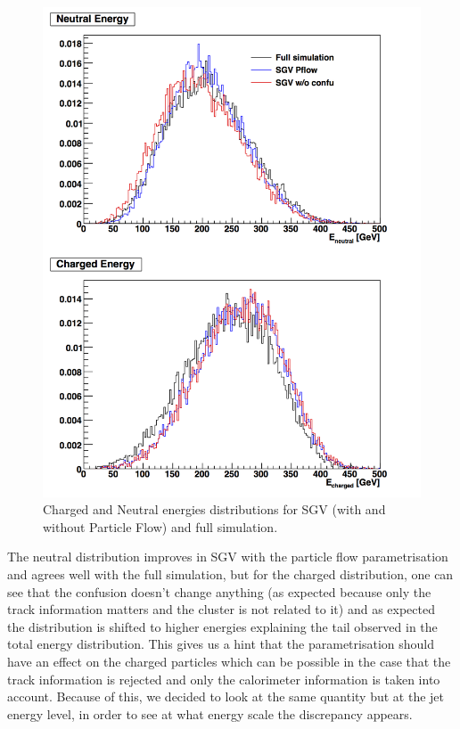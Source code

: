 \documentclass[a4paper,12pt]{article}
\begin{document}
\begin{figure}[!h]
   \centering
  \includegraphics[scale=0.5]{Total_EneuEcha_notjet.png} 
      \caption{Charged and Neutral energies distributions for SGV (with and without Particle Flow) and full simulation.}
   \label{fig:energies2}
\end{figure}

The neutral distribution improves in SGV with the particle flow parametrisation and agrees well with the full simulation, but for the charged distribution, one can see that the confusion doesn't change anything (as expected because only the track information matters and the cluster is not related to it) and as expected the distribution is shifted to higher energies explaining the tail observed in the total energy distribution. This gives us a hint that the parametrisation should have an effect on the charged particles which can be possible in the case that the track information is rejected and only the calorimeter information is taken into account. 
Because of this, we decided to look at the same quantity but at the jet energy level, in order to see at what energy scale the discrepancy appears.
\end{document}

